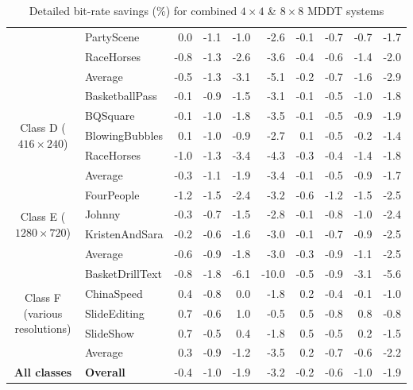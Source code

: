 \documentclass[11pt,a4paper,openright,twoside]{book}
\numberwithin{equation}{section} %
\numberwithin{figure}{section} %
\numberwithin{table}{section} %
\begin{document}
\begin{table}[tb]
\begin{tabularx}{\textwidth}{c|X|rr|rr|rr|rr}
		& PartyScene           & 0.0  & -1.1 & -1.0 & -2.6  & -0.1 & -0.7 & -0.7 & -1.7 \\
		& RaceHorses           & -0.8 & -1.3 & -2.6 & -3.6  & -0.4 & -0.6 & -1.4 & -2.0 \\
		\cline{2-10}
		& Average              & -0.5 & -1.3 & -3.1 & -5.1  & -0.2 & -0.7 & -1.6 & -2.9 \\
		\hline\hline
		\multirow{5}{0.10\textwidth}{\centering Class D ($416\times240$)}
		& BasketballPass       & -0.1 & -0.9 & -1.5 & -3.1  & -0.1 & -0.5 & -1.0 & -1.8 \\
		& BQSquare             & -0.1 & -1.0 & -1.8 & -3.5  & -0.1 & -0.5 & -0.9 & -1.9 \\
		& BlowingBubbles       & 0.1  & -1.0 & -0.9 & -2.7  & 0.1  & -0.5 & -0.2 & -1.4 \\
		& RaceHorses           & -1.0 & -1.3 & -3.4 & -4.3  & -0.3 & -0.4 & -1.4 & -1.8 \\
		\cline{2-10}
		& Average              & -0.3 & -1.1 & -1.9 & -3.4  & -0.1 & -0.5 & -0.9 & -1.7 \\
		\hline\hline
		\multirow{4}{0.10\textwidth}{\centering Class E ($1280\times720$)}
		& FourPeople           & -1.2 & -1.5 & -2.4 & -3.2  & -0.6 & -1.2 & -1.5 & -2.5 \\
		& Johnny               & -0.3 & -0.7 & -1.5 & -2.8  & -0.1 & -0.8 & -1.0 & -2.4 \\    
		& KristenAndSara       & -0.2 & -0.6 & -1.6 & -3.0  & -0.1 & -0.7 & -0.9 & -2.5 \\
		\cline{2-10}
		& Average              & -0.6 & -0.9 & -1.8 & -3.0  & -0.3 & -0.9 & -1.1 & -2.5 \\
		\hline\hline
		\multirow{5}{0.10\textwidth}{\centering Class F (various resolutions)}
		& BasketDrillText      & -0.8 & -1.8 & -6.1 & -10.0 & -0.5 & -0.9 & -3.1 & -5.6 \\
		& ChinaSpeed           & 0.4  & -0.8 & 0.0  & -1.8  & 0.2  & -0.4 & -0.1 & -1.0 \\
		& SlideEditing         & 0.7  & -0.6 & 1.0  & -0.5  & 0.5  & -0.8 & 0.8  & -0.8 \\
		& SlideShow            & 0.7  & -0.5 & 0.4  & -1.8  & 0.5  & -0.5 & 0.2  & -1.5 \\
		\cline{2-10}
		& Average              & 0.3  & -0.9 & -1.2 & -3.5  & 0.2  & -0.7 & -0.6 & -2.2 \\
		\hline\hline
		\bf All classes
		& \bf Overall          & -0.4 & -1.0 & -1.9 & -3.2  & -0.2 & -0.6 & -1.0 & -1.9 \\
	\end{tabularx}
	\caption{Detailed bit-rate savings (\%) for combined $4\times4$ \& $8\times8$
	\acs{MDDT} systems}
	\label{tab:detailed_mddt_bd_rate}
\end{table}
\end{document}
